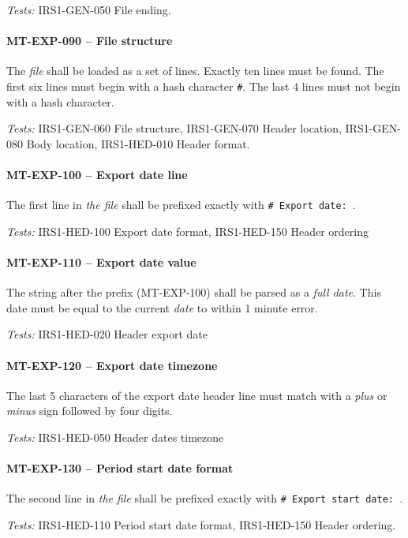 \textit{Tests: } IRS1-GEN-050 File ending.

\paragraph{MT-EXP-090 -- File structure}
The \emph{file} shall be loaded as a set of lines.
Exactly ten lines must be found.
The first six lines must begin with a hash character \lstinline{#}.
The last 4 lines must not begin with a hash character.

\textit{Tests: } IRS1-GEN-060 File structure, IRS1-GEN-070 Header location,
IRS1-GEN-080 Body location, IRS1-HED-010 Header format.

\paragraph{MT-EXP-100 -- Export date line}
The first line in \emph{the file} shall be prefixed exactly with
\lstinline{# Export date: }.

\textit{Tests: } IRS1-HED-100 Export date format, IRS1-HED-150 Header ordering

\paragraph{MT-EXP-110 -- Export date value}
The string after the prefix (MT-EXP-100) shall be parsed as a \emph{full date}.
This date must be equal to the current \emph{date} to within 1 minute error.

\textit{Tests: } IRS1-HED-020 Header export date

\paragraph{MT-EXP-120 -- Export date timezone}
The last 5 characters of the export date header line must match
with a \emph{plus} or \emph{minus} sign followed by four digits.

\textit{Tests: } IRS1-HED-050 Header dates timezone

\paragraph{MT-EXP-130 -- Period start date format}
The second line in \emph{the file} shall be prefixed exactly with
\lstinline{# Export start date: }.

\textit{Tests: } IRS1-HED-110 Period start date format, IRS1-HED-150 Header
ordering.

